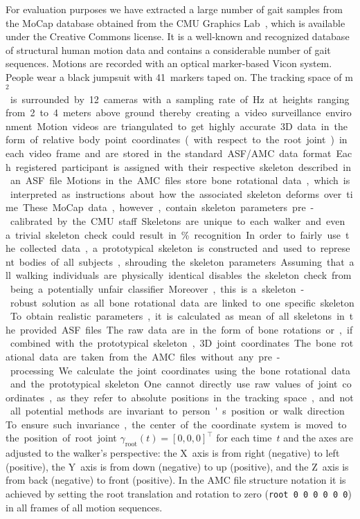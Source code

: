 \documentclass[10pt,a4paper]{llncs}
\newcommand{\gGAMMAjt}[2]{\ensuremath{\gamma_{#1}\left(#2\right)}} %
\begin{document}
For evaluation purposes we have extracted a large number of gait samples from the MoCap database obtained from the CMU Graphics Lab~\cite{CMU03}, which is available under the Creative Commons license. It is a well-known and recognized database of structural human motion data and contains a considerable number of gait sequences. Motions are recorded with an optical marker-based Vicon system. People wear a black jumpsuit with 41~markers taped on. The tracking space of \unit[30]{m$^2$} is surrounded by 12~cameras with a~sampling rate of \unit[120]{Hz} at heights ranging from 2 to 4~meters above ground thereby creating a video surveillance environment. Motion videos are triangulated to get highly accurate 3D data in the form of relative body point coordinates (with respect to the root joint) in each video frame and are stored in the standard ASF/AMC data format. Each registered participant is assigned with their respective skeleton described in an ASF file. Motions in the AMC files store bone rotational data, which is interpreted as instructions about how the associated skeleton deforms over time.

These MoCap data, however, contain skeleton parameters pre-calibrated by the CMU staff. Skeletons are unique to each walker and even a trivial skeleton check could result in \unit[100]{\%}~recognition. In order to fairly use the collected data, a prototypical skeleton is constructed and used to represent bodies of all subjects, shrouding the skeleton parameters. Assuming that all walking individuals are physically identical disables the skeleton check from being a potentially unfair classifier. Moreover, this is a skeleton-robust solution as all bone rotational data are linked to one specific skeleton. To obtain realistic parameters, it is calculated as mean of all skeletons in the provided ASF files.

The raw data are in the form of bone rotations or, if combined with the prototypical skeleton, 3D joint coordinates. The bone rotational data are taken from the AMC files without any pre-processing. We calculate the joint coordinates using the bone rotational data and the prototypical skeleton. One cannot directly use raw values of joint coordinates, as they refer to absolute positions in the tracking space, and not all potential methods are invariant to person's position or walk direction. To ensure such invariance, the center of the coordinate system is moved to the position of root joint $\gGAMMAjt{\mathrm{root}}{t}=[0,0,0]^\top$ for each time~$t$ and the axes are adjusted to the walker's perspective: the X~axis is from right (negative) to left (positive), the Y~axis is from down (negative) to up (positive), and the Z~axis is from back (negative) to front (positive). In the AMC file structure notation it is achieved by setting the root translation and rotation to zero (\texttt{root 0 0 0 0 0 0}) in all frames of all motion sequences.
\end{document}
